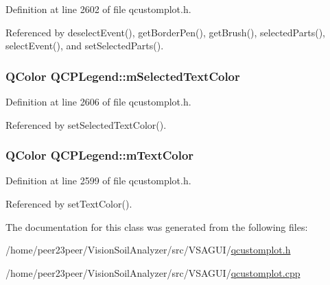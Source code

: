 Definition at line 2602 of file qcustomplot.\+h.



Referenced by deselect\+Event(), get\+Border\+Pen(), get\+Brush(), selected\+Parts(), select\+Event(), and set\+Selected\+Parts().

\hypertarget{class_q_c_p_legend_a6c25c8796c6e73e983aae6024965f2be}{}
\subsubsection[{m\+Selected\+Text\+Color}]{\setlength{\rightskip}{0pt plus 5cm}Q\+Color Q\+C\+P\+Legend\+::m\+Selected\+Text\+Color\hspace{0.3cm}{\ttfamily [protected]}}\label{class_q_c_p_legend_a6c25c8796c6e73e983aae6024965f2be}


Definition at line 2606 of file qcustomplot.\+h.



Referenced by set\+Selected\+Text\+Color().

\hypertarget{class_q_c_p_legend_a478b2d809a7390e9ff8f8bb70d6bd9fe}{}
\subsubsection[{m\+Text\+Color}]{\setlength{\rightskip}{0pt plus 5cm}Q\+Color Q\+C\+P\+Legend\+::m\+Text\+Color\hspace{0.3cm}{\ttfamily [protected]}}\label{class_q_c_p_legend_a478b2d809a7390e9ff8f8bb70d6bd9fe}


Definition at line 2599 of file qcustomplot.\+h.



Referenced by set\+Text\+Color().



The documentation for this class was generated from the following files\+:\begin{DoxyCompactItemize}
\item 
/home/peer23peer/\+Vision\+Soil\+Analyzer/src/\+V\+S\+A\+G\+U\+I/\hyperlink{qcustomplot_8h}{qcustomplot.\+h}\item 
/home/peer23peer/\+Vision\+Soil\+Analyzer/src/\+V\+S\+A\+G\+U\+I/\hyperlink{qcustomplot_8cpp}{qcustomplot.\+cpp}\end{DoxyCompactItemize}
